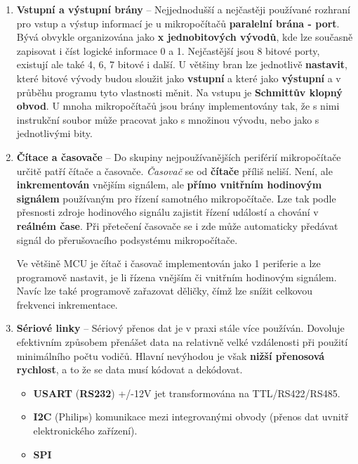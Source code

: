 \begin{enumerate}
    \item \textbf{Vstupní a výstupní brány} -- Nejjednodušší a nejčastěji používané rozhraní pro vstup a výstup informací je u mikropočítačů \textbf{paralelní brána - port}. Bývá obvykle organizována jako  \textbf{x jednobitových vývodů}, kde lze současně zapisovat i číst logické informace 0 a 1. Nejčastější jsou 8 bitové porty, existují ale také 4, 6, 7 bitové i další. U většiny bran lze jednotlivě \textbf{nastavit}, které bitové vývody budou sloužit jako \textbf{vstupní} a které jako \textbf{výstupní} a v průběhu programu tyto vlastnosti měnit. Na vstupu je \textbf{Schmittův klopný obvod}. U mnoha mikropočítačů jsou brány implementovány tak, že s nimi instrukční soubor může pracovat jako s množinou vývodu, nebo jako s jednotlivými bity.

    \item \textbf{Čítace a časovače} -- Do skupiny nejpoužívanějších periférií mikropočítače určitě patří čítače a časovače.
          \emph{Časovač} se od \textbf{čítače} příliš neliší. Není, ale \textbf{inkrementován} vnějším signálem, ale \textbf{přímo vnitřním hodinovým signálem} používaným pro řízení samotného mikropočítače. Lze tak podle přesnosti zdroje hodinového signálu zajistit řízení událostí a chování v \textbf{reálném čase}. Při přetečení časovače se i zde může automaticky předávat signál do přerušovacího podsystému mikropočítače.

          Ve většině MCU je čítač i časovač implementován jako 1 periferie a lze programově nastavit, je li řízena vnějším či vnitřním hodinovým signálem. Navíc lze také programově zařazovat děličky, čímž lze snížit celkovou frekvenci inkrementace.

    \item \textbf{Sériové linky} -- Sériový přenos dat je v praxi stále více používán. Dovoluje efektivním způsobem
          přenášet data na relativně velké vzdálenosti při použití minimálního počtu vodičů. Hlavní nevýhodou je však \textbf{nižší přenosová rychlost}, a to že se data musí kódovat a dekódovat.
          \begin{itemize}
              \item \textbf{USART} (\textbf{RS232}) +/-12V jet transformována na TTL/RS422/RS485.
              \item \textbf{I2C} (Philips) komunikace mezi integrovanými obvody (přenos dat uvnitř elektronického zařízení).
              \item \textbf{SPI}
          \end{itemize}


\end{enumerate}

